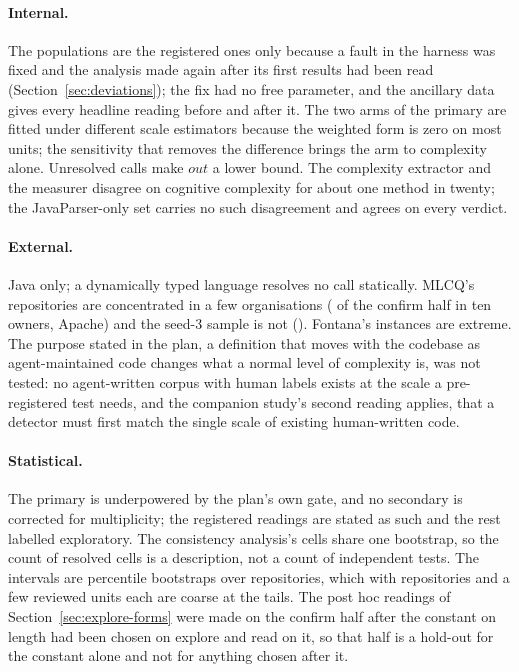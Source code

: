 \documentclass[11pt,a4paper]{article}
\begin{document}
\paragraph{Internal.} The populations are the registered ones only because
a fault in the harness was fixed and the analysis made again after its
first results had been read (Section~\ref{sec:deviations}); the fix had no
free parameter, and the ancillary data gives every headline reading before
and after it. The two arms
of the primary are fitted under different scale estimators because the
weighted form is zero on most units; the sensitivity that removes the
difference brings the arm to complexity alone. Unresolved calls make
$\mathit{out}$ a lower bound. The complexity extractor and the measurer
disagree on cognitive complexity for about one method in twenty; the
JavaParser-only set carries no such disagreement and agrees on every
verdict.

\paragraph{External.} Java only; a dynamically typed language resolves no
call statically. MLCQ's repositories are concentrated in a few organisations
(\mlcqOwnerTopShare{} of the confirm half in ten owners,
\mlcqApacheRepos{} Apache) and the seed-3 sample is not
(\seedThreeOwnerTopShare{}). Fontana's instances are extreme. The purpose
stated in the plan, a definition that moves with the codebase as
agent-maintained code changes what a normal level of complexity is, was not
tested: no agent-written corpus with human labels exists at the scale a
pre-registered test needs, and the companion study's second reading
applies, that a detector must first match the single scale of existing
human-written code.

\paragraph{Statistical.} The primary is underpowered by the plan's own
gate, and no secondary is corrected for multiplicity; the registered
readings are stated as such and the rest labelled exploratory. The
consistency analysis's cells share one bootstrap, so the count of resolved
cells is a description, not a count of independent tests. The intervals are
percentile bootstraps over repositories, which with \primRepos{}
repositories and a few reviewed units each are coarse at the tails. The
post hoc readings of Section~\ref{sec:explore-forms} were made on the
confirm half after the constant on length had been chosen on explore and
read on it, so that half is a hold-out for the constant alone and not for
anything chosen after it.
\end{document}
